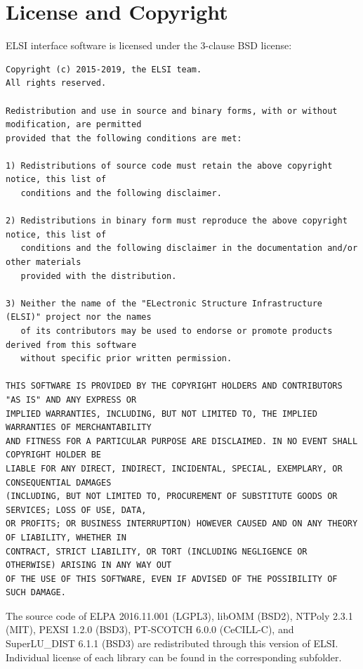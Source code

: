 \documentclass{report}
\begin{document}



\chapter*{License and Copyright}
ELSI interface software is licensed under the 3-clause BSD license:

\begin{tcolorbox}
\begin{Verbatim}
Copyright (c) 2015-2019, the ELSI team.
All rights reserved.

Redistribution and use in source and binary forms, with or without modification, are permitted
provided that the following conditions are met:

1) Redistributions of source code must retain the above copyright notice, this list of
   conditions and the following disclaimer.

2) Redistributions in binary form must reproduce the above copyright notice, this list of
   conditions and the following disclaimer in the documentation and/or other materials
   provided with the distribution.

3) Neither the name of the "ELectronic Structure Infrastructure (ELSI)" project nor the names
   of its contributors may be used to endorse or promote products derived from this software
   without specific prior written permission.

THIS SOFTWARE IS PROVIDED BY THE COPYRIGHT HOLDERS AND CONTRIBUTORS "AS IS" AND ANY EXPRESS OR
IMPLIED WARRANTIES, INCLUDING, BUT NOT LIMITED TO, THE IMPLIED WARRANTIES OF MERCHANTABILITY
AND FITNESS FOR A PARTICULAR PURPOSE ARE DISCLAIMED. IN NO EVENT SHALL COPYRIGHT HOLDER BE
LIABLE FOR ANY DIRECT, INDIRECT, INCIDENTAL, SPECIAL, EXEMPLARY, OR CONSEQUENTIAL DAMAGES
(INCLUDING, BUT NOT LIMITED TO, PROCUREMENT OF SUBSTITUTE GOODS OR SERVICES; LOSS OF USE, DATA,
OR PROFITS; OR BUSINESS INTERRUPTION) HOWEVER CAUSED AND ON ANY THEORY OF LIABILITY, WHETHER IN
CONTRACT, STRICT LIABILITY, OR TORT (INCLUDING NEGLIGENCE OR OTHERWISE) ARISING IN ANY WAY OUT
OF THE USE OF THIS SOFTWARE, EVEN IF ADVISED OF THE POSSIBILITY OF SUCH DAMAGE.
\end{Verbatim}
\end{tcolorbox}

The source code of ELPA 2016.11.001 (LGPL3), libOMM (BSD2), NTPoly 2.3.1 (MIT), PEXSI 1.2.0 (BSD3), PT-SCOTCH 6.0.0 (CeCILL-C), and SuperLU\_DIST 6.1.1 (BSD3) are redistributed through this version of ELSI. Individual license of each library can be found in the corresponding subfolder.
\end{document}
